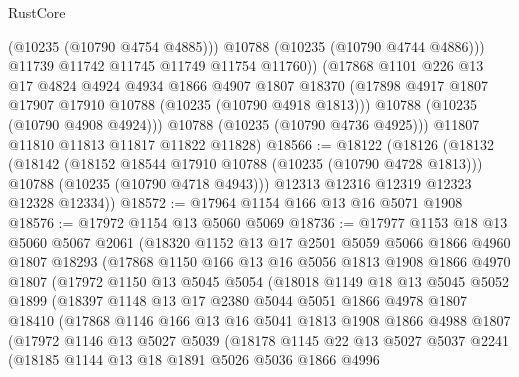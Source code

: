 \begin{lexlean}{RustCore}
\begin{coremodule}
                (@10235 (@10790 @4754 @4885)))
              @10788
              (@10235 (@10790 @4744 @4886)))
            @11739
            @11742
            @11745
            @11749
            @11754
            @11760))
        (@17868
          @1101
          @226
          @13
          @17
          @4824
          @4924
          @4934
          @1866
          @4907
          @1807
          @18370
          (@17898 @4917 @1807 @17907 @17910 @10788 (@10235 (@10790 @4918 @1813)))
          @10788
          (@10235 (@10790 @4908 @4924)))
        @10788
        (@10235 (@10790 @4736 @4925)))
      @11807
      @11810
      @11813
      @11817
      @11822
      @11828)
@18566 := @18122
    (@18126
      (@18132
        (@18142
          (@18152 @18544 @17910 @10788 (@10235 (@10790 @4728 @1813)))
          @10788
          (@10235 (@10790 @4718 @4943)))
        @12313
        @12316
        @12319
        @12323
        @12328
        @12334))
@18572 := @17964 @1154 @166 @13 @16 @5071 @1908
@18576 := @17972 @1154 @13 @5060 @5069
@18736 := @17977
    @1153
    @18
    @13
    @5060
    @5067
    @2061
    (@18320
      @1152
      @13
      @17
      @2501
      @5059
      @5066
      @1866
      @4960
      @1807
      @18293
      (@17868
        @1150
        @166
        @13
        @16
        @5056
        @1813
        @1908
        @1866
        @4970
        @1807
        (@17972
          @1150
          @13
          @5045
          @5054
          (@18018
            @1149
            @18
            @13
            @5045
            @5052
            @1899
            (@18397
              @1148
              @13
              @17
              @2380
              @5044
              @5051
              @1866
              @4978
              @1807
              @18410
              (@17868
                @1146
                @166
                @13
                @16
                @5041
                @1813
                @1908
                @1866
                @4988
                @1807
                (@17972
                  @1146
                  @13
                  @5027
                  @5039
                  (@18178
                    @1145
                    @22
                    @13
                    @5027
                    @5037
                    @2241
                    (@18185
                      @1144
                      @13
                      @18
                      @1891
                      @5026
                      @5036
                      @1866
                      @4996

\end{coremodule}
\end{lexlean}
